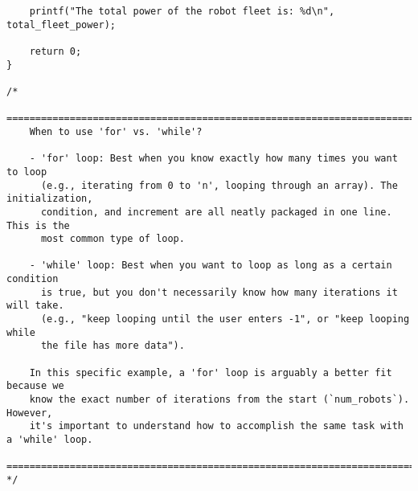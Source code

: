 \documentclass[11pt]{book}
\begin{document}
\begin{verbatim}
    printf("The total power of the robot fleet is: %d\n", total_fleet_power);

    return 0;
}

/*
    ================================================================================
    When to use 'for' vs. 'while'?

    - 'for' loop: Best when you know exactly how many times you want to loop
      (e.g., iterating from 0 to 'n', looping through an array). The initialization,
      condition, and increment are all neatly packaged in one line. This is the
      most common type of loop.

    - 'while' loop: Best when you want to loop as long as a certain condition
      is true, but you don't necessarily know how many iterations it will take.
      (e.g., "keep looping until the user enters -1", or "keep looping while
      the file has more data").

    In this specific example, a 'for' loop is arguably a better fit because we
    know the exact number of iterations from the start (`num_robots`). However,
    it's important to understand how to accomplish the same task with a 'while' loop.
    ================================================================================
*/

\end{verbatim}
\end{document}
